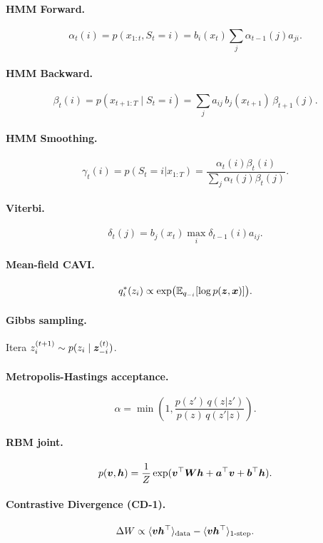 \paragraph{HMM Forward.}
\[
\alpha_t(i) = p(x_{1:t}, S_t = i) = b_i(x_t) \sum_j \alpha_{t-1}(j) a_{ji}.
\]

\paragraph{HMM Backward.}
\[
\beta_t(i) = p(x_{t+1:T} \mid S_t = i) = \sum_j a_{ij}\, b_j(x_{t+1})\, \beta_{t+1}(j).
\]

\paragraph{HMM Smoothing.}
\[
\gamma_t(i) = p(S_t=i|x_{1:T}) = \frac{\alpha_t(i)\beta_t(i)}{\sum_j \alpha_t(j)\beta_t(j)}.
\]

\paragraph{Viterbi.}
\[
\delta_t(j) = b_j(x_t) \max_i \delta_{t-1}(i) a_{ij}.
\]

\paragraph{Mean-field CAVI.}
\[
q_i^*(z_i) \propto \exp\!\big(\mathbb{E}_{q_{-i}}[\log p(\bm{z}, \bm{x})]\big).
\]

\paragraph{Gibbs sampling.} Itera $z_i^{(t+1)} \sim p(z_i \mid \bm{z}_{-i}^{(t)})$.

\paragraph{Metropolis-Hastings acceptance.}
\[
\alpha = \min\!\left(1, \frac{p(z')\,q(z|z')}{p(z)\,q(z'|z)}\right).
\]

\paragraph{RBM joint.}
\[
p(\bm{v},\bm{h}) = \frac{1}{Z}\exp(\bm{v}^\top \bm{W}\bm{h} + \bm{a}^\top\bm{v} + \bm{b}^\top\bm{h}).
\]

\paragraph{Contrastive Divergence (CD-1).}
\[
\Delta W \propto \langle \bm{v}\bm{h}^\top \rangle_{\text{data}} - \langle \bm{v}\bm{h}^\top \rangle_{\text{1-step}}.
\]

